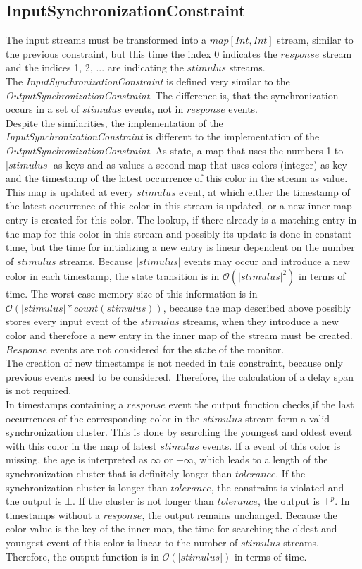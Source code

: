 \subsection{InputSynchronizationConstraint}
	The input streams must be transformed into a $map[Int, Int]$ stream, similar to the previous constraint, but this time the index 0 indicates the $response$ stream and the indices 1, 2, ... are indicating the $stimulus$ streams.\\
	The \emph{InputSynchronizationConstraint} is defined very similar to the \emph{OutputSynchronizationConstraint}. The difference is, that the synchronization occurs in a set of $stimulus$ events, not in $response$ events.\\
	Despite the similarities, the implementation of the \emph{InputSynchronizationConstraint}  is different to the implementation of the \emph{OutputSynchronizationConstraint}. As state, a map that uses the numbers 1 to $|stimulus|$ as keys and as values a second map that uses colors (integer) as key and the timestamp of the latest occurrence of this color in the stream as value. This map is updated at every $stimulus$ event, at which either the timestamp of the latest occurrence of this color in this stream is updated, or a new inner map entry is created for this color.  The lookup, if there already is a matching entry in the map for this color in this stream and possibly its update is done in constant time, but the time for initializing a new entry is linear dependent on the number of $stimulus$ streams. Because $|stimulus|$ events may occur and introduce a new color in each timestamp, the state transition is in $\mathcal{O}(|stimulus|^2)$ in terms of time. The worst case memory size of this information is in $\mathcal{O}(|stimulus|*count(stimulus))$, because the map described above possibly stores every input event of the $stimulus$ streams, when they introduce a new color and therefore a new entry in the inner map of the stream must be created. $Response$ events are not considered for the state of the monitor.\\
	The creation of new timestamps is not needed in this constraint, because only previous events need to be considered. Therefore, the calculation of a delay span is not required.\\
	In timestamps containing a $response$ event the output function checks,if the last occurrences of the corresponding color in the $stimulus$ stream form a valid synchronization cluster. This is done by searching the youngest and oldest event with this color in the map of latest $stimulus$ events. If a event of this color is missing, the age is interpreted as $\infty$ or $-\infty$, which leads to a length of the synchronization cluster that is definitely longer than $tolerance$. If the synchronization cluster is longer than $tolerance$, the constraint is violated and the output is $\bot$. If the cluster is not longer than $tolerance$, the output is $\top^p$. In timestamps without a $response$, the output remains unchanged. Because the color value is the key of the inner map, the time for searching the oldest and youngest event of this color is linear to the number of $stimulus$ streams. Therefore, the output function is in $\mathcal{O}(|stimulus|)$ in terms of time.
	
